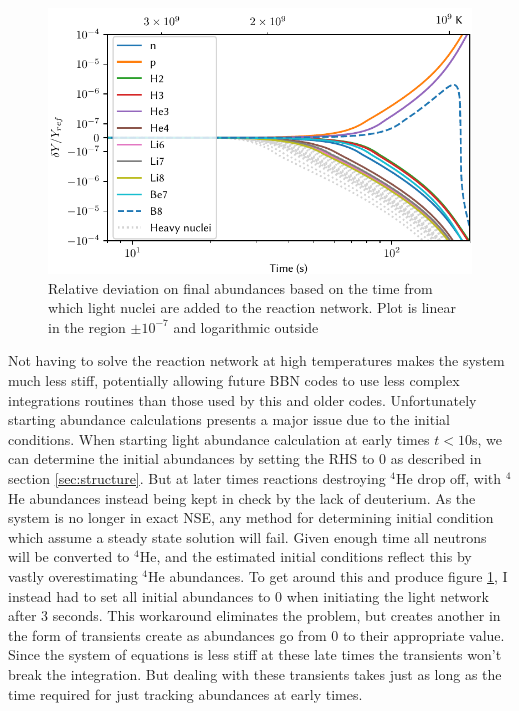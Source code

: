 \begin{figure}[ht]
    \includegraphics[width=5.1in]{figures/midnettime.pdf}
    \caption{Relative deviation on final abundances based on the time from which light nuclei are added to the reaction network. Plot is linear in the region $\pm 10^{-7}$ and logarithmic outside}
    \label{fig:midnettime}
\end{figure}
Not having to solve the reaction network at high temperatures makes the system much less stiff, potentially allowing future BBN codes to use less complex integrations routines than those used by this and older codes. Unfortunately starting abundance calculations presents a major issue due to the initial conditions. When starting light abundance calculation at early times $t<10$s, we can determine the initial abundances by setting the RHS to 0 as described in section \ref{sec:structure}. But at later times reactions destroying ${}^4$He drop off, with ${}^4$He abundances instead being kept in check by the lack of deuterium. As the system is no longer in exact NSE, any method for determining initial condition which assume a steady state solution will fail. Given enough time all neutrons will be converted to ${}^4$He, and the estimated initial conditions reflect this by vastly overestimating ${}^4$He abundances. To get around this and produce figure \ref{fig:midnettime}, I instead had to set all initial abundances to 0 when initiating the light network after 3 seconds. This workaround eliminates the problem, but creates another in the form of transients create as abundances go from 0 to their appropriate value. Since the system of equations is less stiff at these late times the transients won't break the integration. But dealing with these transients takes just as long as the time required for just tracking abundances at early times. 


